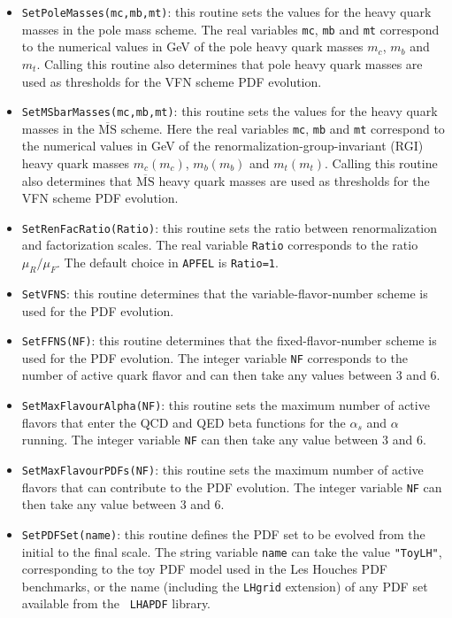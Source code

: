 \documentclass[11pt,a4paper]{article}
\newcommand{\MSbar}{\overline{\mathrm{MS}}}
\begin{document}
\begin{itemize}
\item {\tt SetPoleMasses(mc,mb,mt)}: this routine sets the values for
  the heavy quark masses in the pole mass scheme. The real variables {\tt mc},
 {\tt mb} and {\tt mt} correspond to the numerical values in GeV of the pole heavy quark masses
 $m_c$, $m_b$ and $m_t$. Calling this routine also determines that
 pole heavy quark masses are used as thresholds for the VFN scheme PDF evolution.
 
\item {\tt SetMSbarMasses(mc,mb,mt)}: this routine sets the values for
  the heavy quark masses in the $\MSbar$  scheme. Here the real variables {\tt mc},
 {\tt mb} and {\tt mt} correspond to the numerical values in GeV of the 
renormalization-group-invariant (RGI) heavy quark masses
$m_c(m_c)$, $m_b(m_b)$ and $m_t(m_t)$. Calling this routine also
determines that $\MSbar$ heavy quark masses are used as thresholds for
the VFN scheme PDF evolution.

\item {\tt SetRenFacRatio(Ratio)}: this routine sets the ratio between
  renormalization and factorization scales. The real variable {\tt Ratio}
  corresponds to the ratio $\mu_R / \mu_F$.
%
The default choice in {\tt APFEL} is {\tt Ratio=1}.
%

\item {\tt SetVFNS}: this routine determines that the
  variable-flavor-number scheme is used  for the PDF evolution.

\item {\tt SetFFNS(NF)}: this routine determines that the
  fixed-flavor-number scheme is used  for the PDF evolution. The
  integer variable {\tt NF} corresponds to the number
  of active quark flavor and can then take any values between 3 and 6.

\item {\tt SetMaxFlavourAlpha(NF)}: this routine sets the maximum
  number of active flavors that enter the QCD and QED beta functions
  for the $\alpha_s$ and $\alpha$
  running. The integer variable {\tt NF} can then take any value
  between 3 and 6.

\item {\tt SetMaxFlavourPDFs(NF)}: this routine sets the maximum
  number of active flavors that can contribute to the PDF
  evolution. The integer variable {\tt NF} can then take any value
  between 3 and 6.

\item {\tt SetPDFSet(name)}: this routine defines the PDF set to be
  evolved from the initial to the final scale. The string variable
  {\tt name} can take the value {\tt "ToyLH"}, corresponding to the toy
  PDF model used in the Les Houches PDF benchmarks, 
or the name (including
  the {\tt LHgrid} extension) of any PDF set available from the {\tt
    LHAPDF} library. 


\end{itemize}
\end{document}

